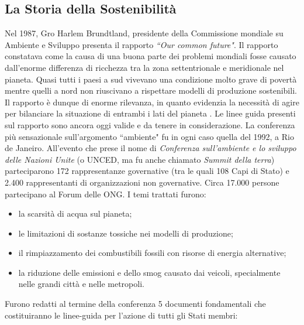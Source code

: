 \subsection{La Storia della Sostenibilità}
\noindent Nel 1987, Gro Harlem Brundtland, presidente della Commissione mondiale su Ambiente e Sviluppo presenta il rapporto \textit{``Our common future"}.\newline
Il rapporto constatava come la causa di una buona parte dei problemi mondiali fosse causato dall'enorme differenza di ricchezza tra la zona settentrionale e meridionale nel pianeta.\newline
Quasi tutti i paesi a sud vivevano una condizione molto grave di povertà mentre quelli a nord non riuscivano a rispettare modelli di produzione sostenibili.\newline
Il rapporto è dunque di enorme rilevanza, in quanto evidenzia la necessità di agire per bilanciare la situazione di entrambi i lati del pianeta \cite{ourCommon}.\newline
Le linee guida presenti sul rapporto sono ancora oggi valide e da tenere in considerazione.\newline
La conferenza più sensazionale sull'argomento ``ambiente" fu in ogni caso quella del 1992, a Rio de Janeiro.\newline
All'evento che prese il nome di \textit{Conferenza sull'ambiente e lo sviluppo delle Nazioni Unite} (o UNCED, ma fu anche chiamato \textit{Summit della terra}) parteciparono 172 rappresentanze governative (tra le quali 108 Capi di Stato) e 2.400 rappresentanti di organizzazioni non governative. Circa 17.000 persone partecipano al Forum delle ONG.\newline
I temi trattati furono:
\begin{itemize}
    \item la scarsità di acqua sul pianeta;
    \item le limitazioni di sostanze tossiche nei modelli di produzione;
    \item il rimpiazzamento dei combustibili fossili con risorse di energia alternative;
    \item la riduzione delle emissioni e dello smog causato dai veicoli, specialmente nelle grandi città e nelle metropoli.
\end{itemize}
Furono redatti al termine della conferenza 5 documenti fondamentali che costituiranno le linee-guida per l'azione di tutti gli Stati membri:
